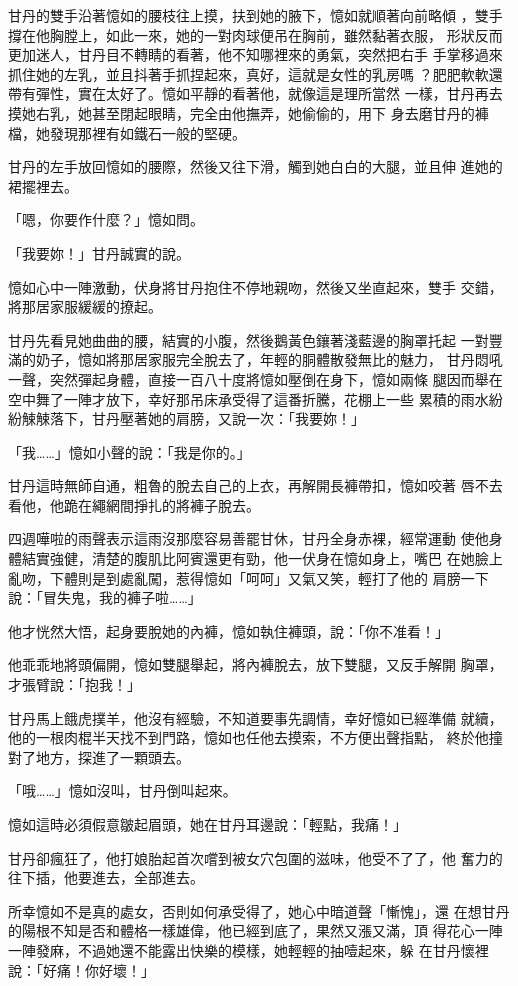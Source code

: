 甘丹的雙手沿著憶如的腰枝往上摸，扶到她的腋下，憶如就順著向前略傾
，雙手撐在他胸膛上，如此一來，她的一對肉球便吊在胸前，雖然黏著衣服，
形狀反而更加迷人，甘丹目不轉睛的看著，他不知哪裡來的勇氣，突然把右手
手掌移過來抓住她的左乳，並且抖著手抓捏起來，真好，這就是女性的乳房嗎
？肥肥軟軟還帶有彈性，實在太好了。憶如平靜的看著他，就像這是理所當然
一樣，甘丹再去摸她右乳，她甚至閉起眼睛，完全由他撫弄，她偷偷的，用下
身去磨甘丹的褲檔，她發現那裡有如鐵石一般的堅硬。

甘丹的左手放回憶如的腰際，然後又往下滑，觸到她白白的大腿，並且伸
進她的裙擺裡去。

「嗯，你要作什麼？」憶如問。

「我要妳！」甘丹誠實的說。

憶如心中一陣激動，伏身將甘丹抱住不停地親吻，然後又坐直起來，雙手
交錯，將那居家服緩緩的撩起。

甘丹先看見她曲曲的腰，結實的小腹，然後鵝黃色鑲著淺藍邊的胸罩托起
一對豐滿的奶子，憶如將那居家服完全脫去了，年輕的胴體散發無比的魅力，
甘丹悶吼一聲，突然彈起身體，直接一百八十度將憶如壓倒在身下，憶如兩條
腿因而舉在空中舞了一陣才放下，幸好那吊床承受得了這番折騰，花棚上一些
累積的雨水紛紛觫觫落下，甘丹壓著她的肩膀，又說一次：「我要妳！」

「我……」憶如小聲的說：「我是你的。」

甘丹這時無師自通，粗魯的脫去自己的上衣，再解開長褲帶扣，憶如咬著
唇不去看他，他跪在繩網間掙扎的將褲子脫去。

四週嘩啦的雨聲表示這雨沒那麼容易善罷甘休，甘丹全身赤裸，經常運動
使他身體結實強健，清楚的腹肌比阿賓還更有勁，他一伏身在憶如身上，嘴巴
在她臉上亂吻，下體則是到處亂闖，惹得憶如「呵呵」又氣又笑，輕打了他的
肩膀一下說：「冒失鬼，我的褲子啦……」

他才恍然大悟，起身要脫她的內褲，憶如執住褲頭，說：「你不准看！」

他乖乖地將頭偏開，憶如雙腿舉起，將內褲脫去，放下雙腿，又反手解開
胸罩，才張臂說：「抱我！」

甘丹馬上餓虎撲羊，他沒有經驗，不知道要事先調情，幸好憶如已經準備
就續，他的一根肉棍半天找不到門路，憶如也任他去摸索，不方便出聲指點，
終於他撞對了地方，探進了一顆頭去。

「哦……」憶如沒叫，甘丹倒叫起來。

憶如這時必須假意皺起眉頭，她在甘丹耳邊說：「輕點，我痛！」

甘丹卻瘋狂了，他打娘胎起首次嚐到被女穴包圍的滋味，他受不了了，他
奮力的往下插，他要進去，全部進去。

所幸憶如不是真的處女，否則如何承受得了，她心中暗道聲「慚愧」，還
在想甘丹的陽根不知是否和體格一樣雄偉，他已經到底了，果然又漲又滿，頂
得花心一陣一陣發麻，不過她還不能露出快樂的模樣，她輕輕的抽噎起來，躲
在甘丹懷裡說：「好痛！你好壞！」


